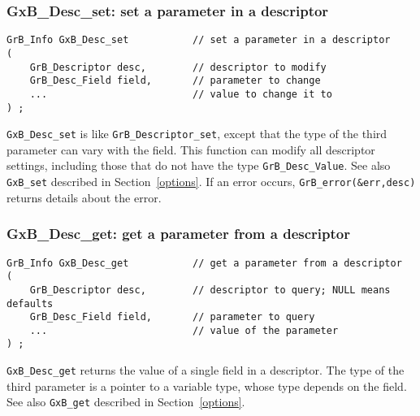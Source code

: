 \documentclass[12pt]{article}
\begin{document}
\newpage
\subsubsection{{\sf GxB\_Desc\_set:}  set a parameter in a descriptor}
\label{desc_set}

\begin{mdframed}[userdefinedwidth=6in]
{\footnotesize
\begin{verbatim}
GrB_Info GxB_Desc_set           // set a parameter in a descriptor
(
    GrB_Descriptor desc,        // descriptor to modify
    GrB_Desc_Field field,       // parameter to change
    ...                         // value to change it to
) ;
\end{verbatim} } \end{mdframed}

\verb'GxB_Desc_set' is like \verb'GrB_Descriptor_set', except that the type of
the third parameter can vary with the field.   This function can modify all
descriptor settings, including those that do not have the type
\verb'GrB_Desc_Value'.  See also \verb'GxB_set' described in
Section~\ref{options}.  If an error occurs, \verb'GrB_error(&err,desc)' returns
details about the error.

\subsubsection{{\sf GxB\_Desc\_get:}  get a parameter from a descriptor}
\label{desc_get}

\begin{mdframed}[userdefinedwidth=6in]
{\footnotesize
\begin{verbatim}
GrB_Info GxB_Desc_get           // get a parameter from a descriptor
(
    GrB_Descriptor desc,        // descriptor to query; NULL means defaults
    GrB_Desc_Field field,       // parameter to query
    ...                         // value of the parameter
) ;
\end{verbatim} } \end{mdframed}

\verb'GxB_Desc_get' returns the value of a single field in a descriptor.  The
type of the third parameter is a pointer to a variable type, whose type depends
on the field.  See also \verb'GxB_get' described in Section~\ref{options}.
\end{document}
